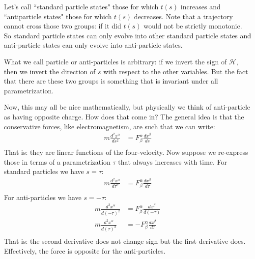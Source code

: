 \documentclass[aps,pra,10pt,floatfix,nofootinbib]{revtex4-1}
\theoremstyle{definition}
\begin{document}
Let's call ``standard particle states" those for which $t(s)$ increases and ``antiparticle states" those for which $t(s)$ decreases. Note that a trajectory cannot cross those two groups: if it did $t(s)$ would not be strictly monotonic. So standard particle states can only evolve into other standard particle states and anti-particle states can only evolve into anti-particle states.

What we call particle or anti-particles is arbitrary: if we invert the sign of $\mathcal{H}$, then we invert the direction of $s$ with respect to the other variables. But the fact that there are these two groups is something that is invariant under all parametrization.

Now, this may all be nice mathematically, but physically we think of anti-particle as having opposite charge. How does that come in? The general idea is that the conservative forces, like electromagnetism, are such that we can write:
\begin{equation}
\begin{aligned}
m\frac{d^2x^\alpha}{ds^2} &= F^\alpha_\beta \frac{dx^\beta}{ds} \\
\end{aligned}
\label{NewtonHamilton}
\end{equation}
That is: they are linear functions of the four-velocity. Now suppose we re-express those in terms of a parametrization $\tau$ that always increases with time. For standard particles we have $s = \tau$:
\begin{equation}
\begin{aligned}
	m\frac{d^2x^\alpha}{d\tau^2} &= F^\alpha_\beta \frac{dx^\beta}{d\tau} \\
\end{aligned}
\label{NewtonHamiltonParticles}
\end{equation}
For anti-particles we have $s = - \tau$:
\begin{equation}
\begin{aligned}
m\frac{d^2x^\alpha}{d(-\tau)^2} &= F^\alpha_\beta \frac{dx^\beta}{d(-\tau)} \\
m\frac{d^2x^\alpha}{d(\tau)^2} &= - F^\alpha_\beta \frac{dx^\beta}{d\tau} \\
\end{aligned}
\label{NewtonHamiltonAntiParticles}
\end{equation}
That is: the second derivative does not change sign but the first derivative does. Effectively, the force is opposite for the anti-particles.
\end{document}
